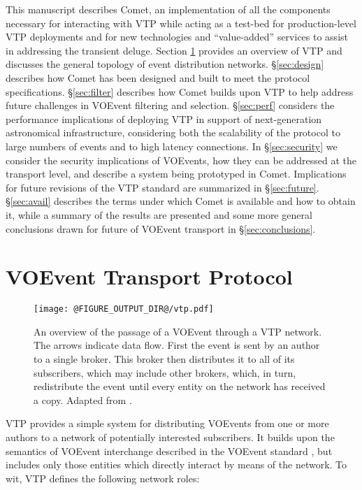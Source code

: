 \documentclass[5p,authoryear]{elsarticle}
\begin{document}
This manuscript describes Comet, an implementation of all the components
necessary for interacting with VTP while acting as a test-bed for
production-level VTP deployments and for new technologies and ``value-added''
services to assist in addressing the transient deluge. Section \ref{sec:vtp}
provides an overview of VTP and discusses the general topology of event
distribution networks.  \S\ref{sec:design} describes how Comet has been
designed and built to meet the protocol specifications. \S\ref{sec:filter}
describes how Comet builds upon VTP to help address future challenges in
VOEvent filtering and selection.  \S\ref{sec:perf} considers the performance
implications of deploying VTP in support of next-generation astronomical
infrastructure, considering both the scalability of the protocol to large
numbers of events and to high latency connections. In \S\ref{sec:security} we
consider the security implications of VOEvents, how they can be addressed at
the transport level, and describe a system being prototyped in Comet.
Implications for future revisions of the VTP standard are summarized in
\S\ref{sec:future}.  \S\ref{sec:avail} describes the terms under which Comet
is available and how to obtain it, while a summary of the results are
presented and some more general conclusions drawn for future of VOEvent
transport in \S\ref{sec:conclusions}.

\section{VOEvent Transport Protocol}
\label{sec:vtp}

\begin{figure}
  \begin{center}
  \texttt{[image: @FIGURE\_OUTPUT\_DIR@/vtp.pdf]}
  \end{center}

  \caption{An overview of the passage of a VOEvent through a VTP network. The
  arrows indicate data flow. First the event is sent by an author to a single
  broker. This broker then distributes it to all of its subscribers, which may
  include other brokers, which, in turn, redistribute the event until every
  entity on the network has received a copy.  Adapted from
  \citet{Swinbank:2014}.}

  \label{fig:vtp}
\end{figure}

VTP provides a simple system for distributing VOEvents from one or more
authors to a network of potentially interested subscribers. It builds upon the
semantics of VOEvent interchange described in the VOEvent standard
\citep{Seaman:2011}, but includes only those entities which directly interact
by means of the network. To wit, VTP defines the following network roles:
\end{document}
